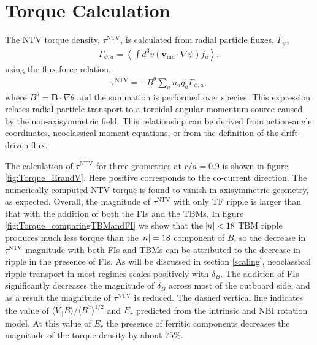 \documentclass[aip, pop, preprint]{revtex4-1}
\numberwithin{figure}{section}
\numberwithin{equation}{section}
\begin{document}
\FloatBarrier

\section{Torque Calculation}\label{torque}

The NTV torque density, $\tau^{\text{NTV}}$, is calculated from radial particle fluxes, $\Gamma_{\psi}$, 
\begin{gather}
\Gamma_{\psi,a} = \left \langle \int d^3v (\bm{v}_{\text{m}a} \cdot \nabla \psi) f_a \right \rangle,
\label{eq:particleflux}
\end{gather}
using the flux-force relation,
\begin{gather}
\tau^{\text{NTV}} = - B^{\theta} \sum_a n_a q_a \Gamma_{\psi, a},
\end{gather}
where $B^{\theta} = \bm{B} \cdot \nabla \theta$ and the summation is performed over species. This expression relates radial particle transport to a toroidal angular momentum source caused by the non-axisymmetric field. This relationship can be derived from action-angle coordinates,\cite{Albert2016} neoclassical moment equations,\cite{Shaing1986} or from the definition of the drift-driven flux.\cite{Shaing2006} 

The calculation of $\tau^{\text{NTV}}$ for three geometries at $r/a = 0.9$ is shown in figure \ref{fig:Torque_ErandV}. Here positive corresponds to the co-current direction. The numerically computed NTV torque is found to vanish in axisymmetric geometry, as expected. Overall, the magnitude of $\tau^{\text{NTV}}$ with only TF ripple is larger than that with the addition of both the FIs and the TBMs.  In figure \ref{fig:Torque_comparingTBMandFI} we show that the $\abs{n} < 18$ TBM  ripple produces much less torque than the $\abs{n} = 18$ component of $B$, so the decrease in $\tau^{\text{NTV}}$ magnitude with both FIs and TBMs can be attributed to the decrease in ripple in the presence of FIs. As will be discussed in section \ref{scaling}, neoclassical ripple transport in most regimes scales positively with $\delta_B$. The addition of FIs significantly decreases the magnitude of $\delta_B$ across most of the outboard side, and as a result the magnitude of $\tau^{\text{NTV}}$ is reduced. The dashed vertical line indicates the value of $\langle V_{||} B\rangle/\langle B^2 \rangle^{1/2}$ and $E_r$ predicted from the intrinsic and NBI rotation model. At this value of $E_r$ the presence of ferritic components decreases the magnitude of the torque density by about $75\%$. 
\end{document}
